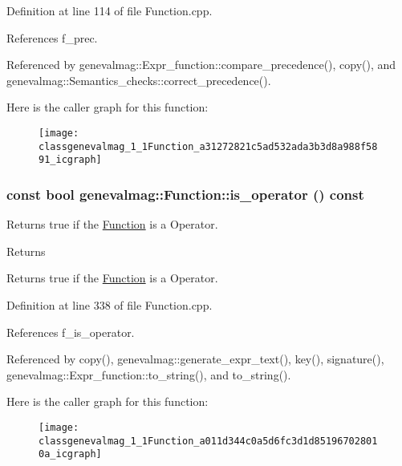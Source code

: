 Definition at line 114 of file Function.cpp.



References f\_\-prec.



Referenced by genevalmag::Expr\_\-function::compare\_\-precedence(), copy(), and genevalmag::Semantics\_\-checks::correct\_\-precedence().



Here is the caller graph for this function:\nopagebreak
\begin{figure}[H]
\begin{center}
\leavevmode
\texttt{[image: classgenevalmag\_1\_1Function\_a31272821c5ad532ada3b3d8a988f5891\_icgraph]}
\end{center}
\end{figure}


\hypertarget{classgenevalmag_1_1Function_a011d344c0a5d6fc3d1d851967028010a}{
\subsubsection[{is\_\-operator}]{\setlength{\rightskip}{0pt plus 5cm}const bool genevalmag::Function::is\_\-operator () const}}
\label{classgenevalmag_1_1Function_a011d344c0a5d6fc3d1d851967028010a}
Returns true if the \hyperlink{classgenevalmag_1_1Function}{Function} is a Operator. \begin{DoxyReturn}{Returns}

\end{DoxyReturn}
Returns true if the \hyperlink{classgenevalmag_1_1Function}{Function} is a Operator. 

Definition at line 338 of file Function.cpp.



References f\_\-is\_\-operator.



Referenced by copy(), genevalmag::generate\_\-expr\_\-text(), key(), signature(), genevalmag::Expr\_\-function::to\_\-string(), and to\_\-string().



Here is the caller graph for this function:\nopagebreak
\begin{figure}[H]
\begin{center}
\leavevmode
\texttt{[image: classgenevalmag\_1\_1Function\_a011d344c0a5d6fc3d1d851967028010a\_icgraph]}
\end{center}
\end{figure}


